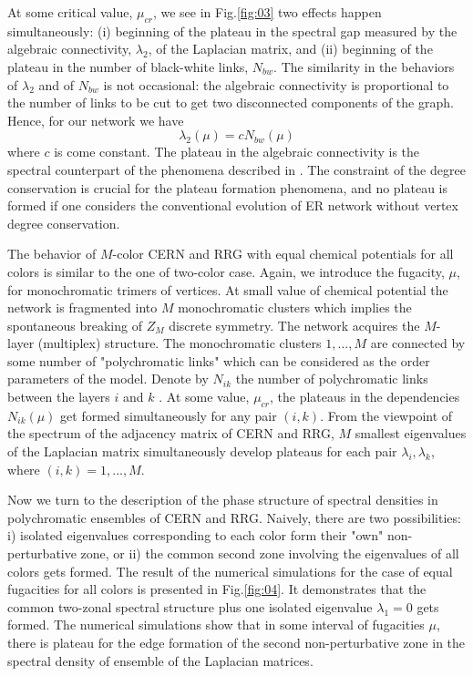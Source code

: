 \documentclass[aps,12pt]{revtex4}
\newcommand{\fig}[1]{Fig.\ref{#1}}
\newcommand{\be}{\begin{equation}}
\newcommand{\ee}{\end{equation}}
\begin{document}
At some critical value, $\mu_{cr}$, we see in \fig{fig:03} two effects happen simultaneously: (i) beginning of the plateau in the spectral gap measured by the algebraic connectivity, $\lambda_2$, of the Laplacian matrix, and (ii) beginning of the plateau in the number of black-white links, $N_{bw}$. The similarity in the behaviors of $\lambda_2$ and of $N_{bw}$ is not occasional: the algebraic connectivity is proportional to the number of links to be cut to get two disconnected components of the graph. Hence, for our network we have
\be
\lambda_2(\mu)= c N_{bw}(\mu)
\ee
where $c$ is come constant. The plateau in the algebraic connectivity is the spectral counterpart of the phenomena described in \cite{color}. The constraint of the degree conservation is crucial for the plateau formation phenomena, and no plateau is formed if one considers the conventional evolution of ER network without vertex degree conservation.

The behavior of $M$-color CERN and RRG with equal chemical potentials for all colors is similar to the one of two-color case. Again, we introduce the fugacity, $\mu$, for monochromatic trimers of vertices. At small value of chemical potential the network is fragmented into $M$ monochromatic clusters which implies the spontaneous breaking of $Z_M$ discrete symmetry. The network acquires the $M$-layer (multiplex) structure. The monochromatic clusters $1,...,M$ are connected by some number of "polychromatic links" which can be considered as the order parameters of the model.  Denote by $N_{ik}$ the number of polychromatic links between the layers $i$ and $k$ . At some value, $\mu_{cr}$, the plateaus in the dependencies $N_{ik}(\mu)$ get formed simultaneously for any pair $(i,k)$. From the viewpoint of the spectrum of the adjacency matrix of CERN and RRG,  $M$ smallest eigenvalues of the Laplacian matrix simultaneously develop plateaus for each pair $\lambda_i, \lambda_k$, where $(i,k) = 1,...,M$.

Now we turn to the description of the phase structure of spectral densities in polychromatic ensembles of CERN and RRG. Naively, there are two possibilities: i) isolated eigenvalues corresponding to each color form their "own" non-perturbative zone, or ii) the common second zone involving the eigenvalues of all colors gets formed. The result of the numerical simulations for the case of equal fugacities for all colors is presented in \fig{fig:04}. It demonstrates that the common two-zonal spectral structure plus one isolated eigenvalue $\lambda_1=0$  gets formed. The numerical simulations show that in some interval of fugacities $\mu$, there is plateau for the edge formation of the second non-perturbative zone in the spectral density of ensemble of the Laplacian matrices.
\end{document}
